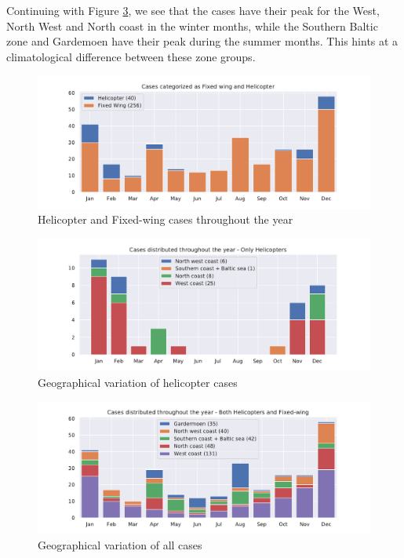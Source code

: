 Continuing with Figure \ref{fig:soner}, we see that the cases have their peak for the West, North West and North coast in the winter months, while the Southern Baltic zone and Gardemoen have their peak during the summer months. This hints at a climatological difference between these zone groups.

\begin{figure}
    \centering
    \includegraphics[width=\textwidth]{Figures/helivsfw.pdf}
    \caption{Helicopter and Fixed-wing cases throughout the year}
    \label{fig:helivsfw}
\end{figure}

\begin{figure}
    \centering
    \includegraphics[width=\textwidth]{Figures/Helisoner.pdf}
    \caption{Geographical variation of helicopter cases}
    \label{fig:helisoner}
\end{figure}

\begin{figure}
    \centering
    \includegraphics[width=\textwidth]{Figures/soner.pdf}
    \caption{Geographical variation of all cases}
    \label{fig:soner}
\end{figure}

